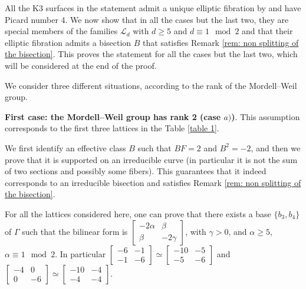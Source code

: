 \documentclass{amsart}
\theoremstyle{definition}
\numberwithin{equation}{section}
\begin{document}
\proof All the K3 surfaces in the statement admit a unique elliptic fibration by \cite{BM} and have Picard number 4. We now show that in all the cases but the last two, they are special members of the families $\mathcal{L}_d$ with $d\geq 5$ and $d\equiv 1\mod 2$ and that their elliptic fibration admits a bisection $B$ that satisfies Remark \ref{rem: non splitting of the bisection}.  This  proves the statement for all the cases but the last two, which will be considered at the end of the proof.

We consider three different situations, according to the rank of the Mordell--Weil group.

{\bf First case: the Mordell--Weil group has rank 2 (case $a)$)}. This assumption corresponds to the first three lattices in the Table \ref{table 1}.

We first identify an effective class $B$ such that $BF=2$ and $B^2=-2$, and then we prove that it is supported on  an irreducible curve (in particular it is not the sum of two sections and possibly some fibers). This guarantees that it indeed corresponds to an irreducible bisection and satisfies Remark \ref{rem: non splitting of the bisection}.

For all the lattices considered here, one can prove that
there exists a base $\{b_3, b_4\}$ of $\Gamma$ such that the bilinear form is $\left[\begin{array}{rr}-2\alpha&\beta\\ \beta&-2\gamma\end{array}\right]$, with $\gamma>0$, and $\alpha\geq 5$, $\alpha\equiv 1\mod 2$. In particular $\left[\begin{array}{cc}-6&-1\\ -1&-6\end{array}\right]\simeq \left[\begin{array}{cc}-10&-5\\ -5&-6\end{array}\right]$ and 
$\left[\begin{array}{rr}-4&0\\ 0&-6\end{array}\right]\simeq \left[\begin{array}{cc}-10&-4\\ -4&-4\end{array}\right]$.
\end{document}
